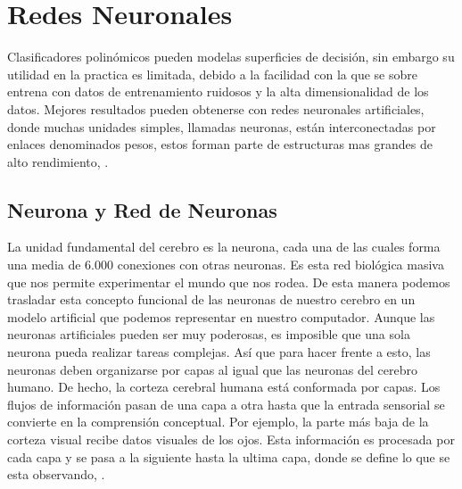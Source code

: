 \section{Redes Neuronales}

    Clasificadores polinómicos pueden modelas superficies de decisión, sin embargo su utilidad en la practica es limitada, debido a la facilidad con la que se sobre entrena con datos de entrenamiento ruidosos y la alta dimensionalidad de los datos. Mejores resultados pueden obtenerse con redes neuronales artificiales, donde muchas unidades simples, llamadas neuronas, están interconectadas por enlaces denominados pesos, estos forman parte de estructuras mas grandes de alto rendimiento, \cite{kubat2015introduction}.



    \subsection{Neurona y Red de Neuronas}

    La unidad fundamental del cerebro es la neurona, cada una de las cuales forma una media de 6.000 conexiones con otras neuronas. Es esta red biológica masiva que nos permite experimentar el mundo que nos rodea. De esta manera podemos trasladar esta concepto funcional de las neuronas de nuestro cerebro en un modelo artificial que podemos representar en nuestro computador. Aunque las neuronas artificiales pueden ser muy poderosas, es imposible que una sola neurona pueda realizar tareas complejas. Así que para hacer frente a esto, las neuronas deben organizarse por capas al igual que las neuronas del cerebro humano. De hecho, la corteza cerebral humana está conformada por capas. Los flujos de información pasan de una capa a otra hasta que la entrada sensorial se convierte en la comprensión conceptual. Por ejemplo, la parte más baja de la corteza visual recibe datos visuales de los ojos. Esta información es procesada por cada capa y se pasa a la siguiente hasta la ultima capa, donde se define lo que se esta observando, \cite{dlBook}.

